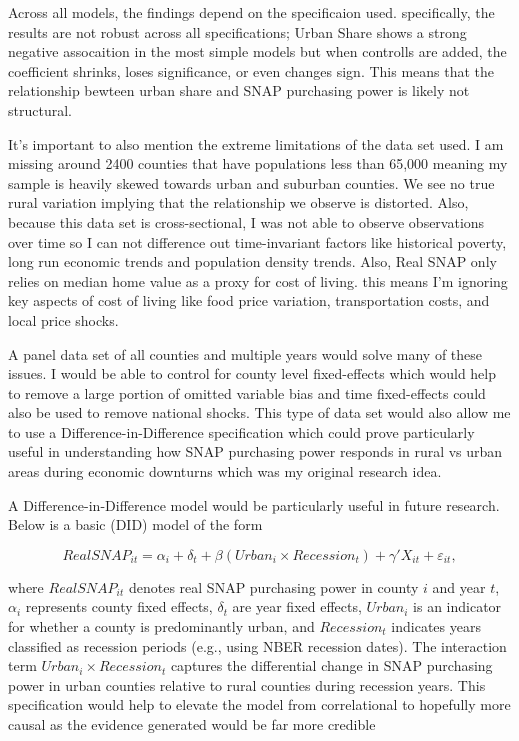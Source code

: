 \documentclass{article}
\begin{document}
Across all models, the findings depend on the specificaion used. specifically, the results are not robust across all specifications; Urban Share shows a strong negative assocaition in the most simple models but when controlls are added, the coefficient shrinks, loses significance, or even changes sign. This means that the relationship bewteen urban share and SNAP purchasing power is likely not structural. 

It's important to also mention the extreme limitations of the data set used. I am missing around 2400 counties that have populations less than 65,000 meaning my sample is heavily skewed towards urban and suburban counties. We see no true rural variation implying that the relationship we observe is distorted. Also, because this data set is cross-sectional, I was not able to observe observations over time so I can not difference out time-invariant factors like historical poverty, long run economic trends and population density trends. Also, Real SNAP only relies on median home value as a proxy for cost of living. this means I'm ignoring key aspects of cost of living like food price variation, transportation costs, and local price shocks. 

A panel data set of all counties and multiple years would solve many of these issues. I would be able to control for county level fixed-effects which would help to remove a large portion of omitted variable bias and time fixed-effects could also be used to remove national shocks. This type of data set would also allow me to use a Difference-in-Difference specification which could prove particularly useful in understanding how SNAP purchasing power responds in rural vs urban areas during economic downturns which was my original research idea. 

A Difference-in-Difference model would be particularly useful in future research. Below is a basic (DID) model of the form

\begin{equation}
    RealSNAP_{it}
    = \alpha_i 
    + \delta_t
    + \beta \left(Urban_i \times Recession_t\right)
    + \gamma' X_{it}
    + \varepsilon_{it},
\end{equation}

where $RealSNAP_{it}$ denotes real SNAP purchasing power in county $i$ and year $t$,
$\alpha_i$ represents county fixed effects, $\delta_t$ are year fixed effects, $Urban_i$ is
an indicator for whether a county is predominantly urban, and $Recession_t$ indicates
years classified as recession periods (e.g., using NBER recession dates). The interaction
term $Urban_i \times Recession_t$ captures the differential change in SNAP purchasing
power in urban counties relative to rural counties during recession years. This specification would help to elevate the model from correlational to hopefully more causal as the evidence generated would be far more credible
\end{document}
